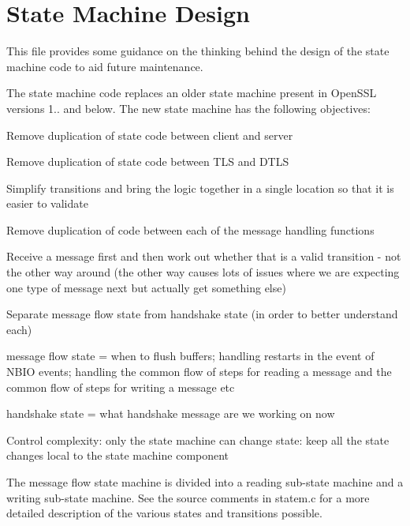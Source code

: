 \chapter{State Machine Design}
\hypertarget{md__c_1_2_users_2namph_2_downloads_2openssl_2openssl-3_82_81_2ssl_2statem_2_r_e_a_d_m_e}{}\label{md__c_1_2_users_2namph_2_downloads_2openssl_2openssl-3_82_81_2ssl_2statem_2_r_e_a_d_m_e}
This file provides some guidance on the thinking behind the design of the state machine code to aid future maintenance.

The state machine code replaces an older state machine present in Open\+SSL versions 1.. and below. The new state machine has the following objectives\+:


\begin{DoxyItemize}
\item Remove duplication of state code between client and server
\item Remove duplication of state code between TLS and DTLS
\item Simplify transitions and bring the logic together in a single location so that it is easier to validate
\item Remove duplication of code between each of the message handling functions
\item Receive a message first and then work out whether that is a valid transition -\/ not the other way around (the other way causes lots of issues where we are expecting one type of message next but actually get something else)
\item Separate message flow state from handshake state (in order to better understand each)
\begin{DoxyItemize}
\item message flow state = when to flush buffers; handling restarts in the event of NBIO events; handling the common flow of steps for reading a message and the common flow of steps for writing a message etc
\item handshake state = what handshake message are we working on now
\end{DoxyItemize}
\item Control complexity\+: only the state machine can change state\+: keep all the state changes local to the state machine component
\end{DoxyItemize}

The message flow state machine is divided into a reading sub-\/state machine and a writing sub-\/state machine. See the source comments in statem.\+c for a more detailed description of the various states and transitions possible.

